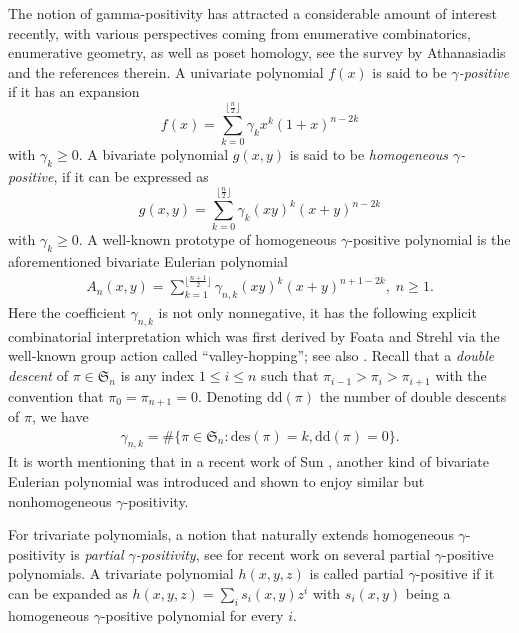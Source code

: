 \documentclass[11pt,reqno]{amsart}
\numberwithin{equation}{section}
\theoremstyle{plain}
\theoremstyle{definition}
\newcommand{\s}{\mathfrak{S}}
\def\des{\mathrm{des}}
\def\ddes{\mathrm{dd}}
\begin{document}
The notion of gamma-positivity has attracted a considerable amount of interest recently, with various perspectives coming from enumerative combinatorics, enumerative geometry, as well as poset homology, see the survey by Athanasiadis \cite{Ath} and the references therein. A univariate polynomial $f(x)$ is said to be {\em $\gamma$-positive} if it has an expansion
$$f(x)=\sum_{k=0}^{\lfloor\frac{n}{2}\rfloor}\gamma_kx^k(1+x)^{n-2k}$$ with $\gamma_k\ge 0$. A bivariate polynomial $g(x,y)$ is said to be {\em homogeneous $\gamma$-positive}, if it can be expressed as
$$g(x,y)=\sum_{k=0}^{\lfloor\frac{n}{2}\rfloor}\gamma_k(xy)^k(x+y)^{n-2k}$$
with $\gamma_k\ge 0$. A well-known prototype of homogeneous $\gamma$-positive polynomial is the aforementioned bivariate Eulerian polynomial
\begin{align}\label{gamma of biEuler}
A_n(x,y)=\sum_{k=1}^{\lfloor\frac{n+1}{2}\rfloor}\gamma_{n,k}(xy)^k(x+y)^{n+1-2k}, \; n\ge 1.
\end{align}
Here the coefficient $\gamma_{n,k}$ is not only nonnegative, it has the following explicit combinatorial interpretation which was first derived by Foata and Strehl \cite{FS} via the well-known group action called ``valley-hopping''; see also \cite{SW,LZ,LMZ}. Recall that a {\em double descent} of $\pi\in\s_n$ is any index $1\le i\le n$ such that $\pi_{i-1}>\pi_i>\pi_{i+1}$ with the convention that $\pi_0=\pi_{n+1}=0$. Denoting $\ddes(\pi)$ the number of double descents of $\pi$, we have
\begin{align}\label{gamma-coef:biEuler}
\gamma_{n,k}=\#\{\pi\in\s_n:\des(\pi)=k,\ddes(\pi)=0\}.
\end{align}
It is worth mentioning that in a recent work of Sun \cite{Sun}, another kind of bivariate Eulerian polynomial was introduced and shown to enjoy similar but nonhomogeneous $\gamma$-positivity.

For trivariate polynomials, a notion that naturally extends homogeneous $\gamma$-positivity is {\em partial $\gamma$-positivity}, see \cite{SZ,LZ,MMY,LMZ} for recent work on several partial $\gamma$-positive polynomials. A trivariate polynomial $h(x,y,z)$ is called partial $\gamma$-positive if it can be expanded as $h(x,y,z)=\sum_i s_i(x,y)z^i$ with $s_i(x,y)$ being a homogeneous $\gamma$-positive polynomial for every $i$.
\end{document}
